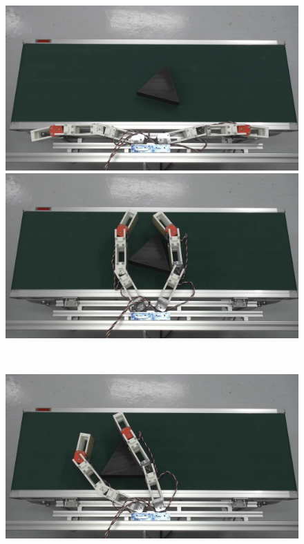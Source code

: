 \documentclass[a4paper,twoside,12pt,papersize, dvipdfmx]{iirthesis}
\begin{document}
\begin{figure}[b]
\begin{minipage}{0.49\hsize}
\centering
\includegraphics[width=\hsize]{fig/1-introduction/triangle_Moment_2.jpg}
\subcaption{}
\end{minipage}\hfill
\begin{minipage}{0.49\hsize}
\centering
\includegraphics[width=\hsize]{fig/1-introduction/triangle_Moment_3.jpg}
\subcaption{}
\end{minipage}\\
\begin{minipage}{0.49\hsize}
\centering
\includegraphics[width=\hsize]{fig/1-introduction/triangle_Moment_5.jpg}

\end{minipage}
\end{figure}
\end{document}
